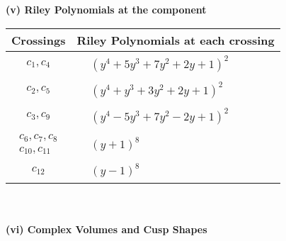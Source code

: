 \documentclass[1p]{elsarticle_modified}
\theoremstyle{definition}
\begin{document}
\newpage\renewcommand{\arraystretch}{1}
\flushleft \textbf{(v) Riley Polynomials at the component}\newline \\
\begin{tabular}{m{50pt}|m{274pt}}
Crossings & \hspace{64pt}Riley Polynomials at each crossing \\
\hline $$\begin{aligned}c_{1},c_{4}\end{aligned}$$&$\begin{aligned}
&(y^4+5 y^3+7 y^2+2 y+1)^2
\end{aligned}$\\
\hline $$\begin{aligned}c_{2},c_{5}\end{aligned}$$&$\begin{aligned}
&(y^4+y^3+3 y^2+2 y+1)^2
\end{aligned}$\\
\hline $$\begin{aligned}c_{3},c_{9}\end{aligned}$$&$\begin{aligned}
&(y^4-5 y^3+7 y^2-2 y+1)^2
\end{aligned}$\\
\hline $$\begin{aligned}c_{6},c_{7},c_{8}\\c_{10},c_{11}\end{aligned}$$&$\begin{aligned}
&(y+1)^8
\end{aligned}$\\
\hline $$\begin{aligned}c_{12}\end{aligned}$$&$\begin{aligned}
&(y-1)^8
\end{aligned}$\\
\hline
\end{tabular}\\~\\
\newpage\flushleft \textbf{(vi) Complex Volumes and Cusp Shapes}
\end{document}
